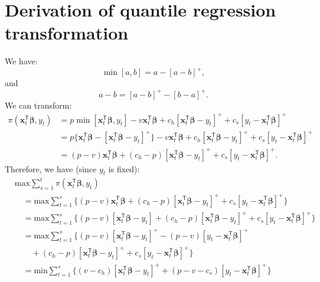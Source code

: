 \documentclass{article}
\begin{document}
\section{Derivation of quantile regression transformation}\label{app:A}
We have:
\[
    \min[a,b]=a-[a-b]^+,
\]
and
\[
    a-b=[a-b]^+-[b-a]^+.
\]
We can transform:
\[
    \begin{aligned}
        \pi(\mathbf{x}_t^{\mathsf{T}}\boldsymbol{\beta},y_t)
        &=p\min[\mathbf{x}_t^{\mathsf{T}}\boldsymbol{\beta},y_t]-v\mathbf{x}_t^{\mathsf{T}}\boldsymbol{\beta}+c_h[\mathbf{x}_t^{\mathsf{T}}\boldsymbol{\beta}-y_t]^++c_s[y_t-\mathbf{x}_t^{\mathsf{T}}\boldsymbol{\beta}]^+\\
        &=p\{\mathbf{x}_t^{\mathsf{T}}\boldsymbol{\beta}-[\mathbf{x}_t^{\mathsf{T}}\boldsymbol{\beta}-y_t]^+\}-v\mathbf{x}_t^{\mathsf{T}}\boldsymbol{\beta}+c_h[\mathbf{x}_t^{\mathsf{T}}\boldsymbol{\beta}-y_t]^++c_s[y_t-\mathbf{x}_t^{\mathsf{T}}\boldsymbol{\beta}]^+\\
        &=(p-v)\mathbf{x}_t^{\mathsf{T}}\boldsymbol{\beta}+(c_h-p)[\mathbf{x}_t^{\mathsf{T}}\boldsymbol{\beta}-y_t]^++c_s[y_t-\mathbf{x}_t^{\mathsf{T}}\boldsymbol{\beta}]^+.
    \end{aligned}
\]
Therefore, we have (since $y_t$ is fixed):
\[
    \begin{aligned}
        &\text{max}\displaystyle\sum_{s=1}^t{\pi(\mathbf{x}_t^{\mathsf{T}}\boldsymbol{\beta},y_t)}\\
        &\quad=\text{max}\displaystyle\sum_{t=1}^s\{(p-v)\mathbf{x}_t^{\mathsf{T}}\boldsymbol{\beta}+(c_h-p)[\mathbf{x}_t^{\mathsf{T}}\boldsymbol{\beta}-y_t]^++c_s[y_t-\mathbf{x}_t^{\mathsf{T}}\boldsymbol{\beta}]^+\}\\
        &\quad=\text{max}\displaystyle\sum_{t=1}^s\{(p-v)[\mathbf{x}_t^{\mathsf{T}}\boldsymbol{\beta}-y_t]+(c_h-p)[\mathbf{x}_t^{\mathsf{T}}\boldsymbol{\beta}-y_t]^++c_s[y_t-\mathbf{x}_t^{\mathsf{T}}\boldsymbol{\beta}]^+\}\\
        &\quad=\text{max}\displaystyle\sum_{t=1}^s\{(p-v)[\mathbf{x}_t^{\mathsf{T}}\boldsymbol{\beta}-y_t]^+-(p-v)[y_t-\mathbf{x}_t^{\mathsf{T}}\boldsymbol{\beta}]^+\\
        &\qquad+(c_h-p)[\mathbf{x}_t^{\mathsf{T}}\boldsymbol{\beta}-y_t]^++c_s[y_t-\mathbf{x}_t^{\mathsf{T}}\boldsymbol{\beta}]^+\}\\
        &\quad=\text{min}\displaystyle\sum_{t=1}^s\{(v-c_h)[\mathbf{x}_t^{\mathsf{T}}\boldsymbol{\beta}-y_t]^++(p-v-c_s)[y_t-\mathbf{x}_t^{\mathsf{T}}\boldsymbol{\beta}]^+\}
    \end{aligned}
\]
\end{document}
